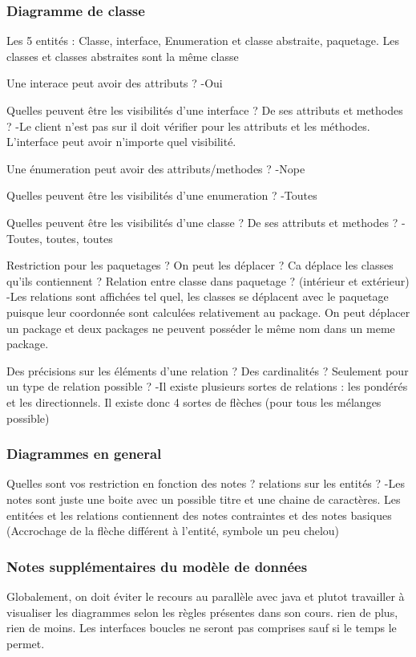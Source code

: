 \documentclass[a4paper,10pt]{article}
\begin{document}
\subsubsection*{Diagramme de classe}

Les 5 entités : Classe, interface, Enumeration et classe abstraite, paquetage.
Les classes et classes abstraites sont la même classe

Une interace peut avoir des attributs ? 
-Oui

Quelles peuvent être les visibilités d'une interface ? De ses attributs et methodes ?
-Le client n'est pas sur il doit vérifier pour les attributs et les méthodes. L'interface peut avoir n'importe quel visibilité. 

Une énumeration peut avoir des attributs/methodes ? 
-Nope

Quelles peuvent être les visibilités d'une enumeration ? 
-Toutes

Quelles peuvent être les visibilités d'une classe ? De ses attributs et methodes ?
-Toutes, toutes, toutes

Restriction pour les paquetages ? On peut les déplacer ? Ca déplace les classes qu'ils contiennent ? Relation entre classe dans paquetage ? (intérieur et extérieur)
-Les relations sont affichées tel quel, les classes se déplacent avec le paquetage puisque leur coordonnée sont calculées relativement au package.
On peut déplacer un package et deux packages ne peuvent posséder le même nom dans un meme package.

Des précisions sur les éléments d'une relation ? Des cardinalités ? Seulement pour un type de relation possible ?
-Il existe plusieurs sortes de relations : les pondérés et les directionnels. Il existe donc 4 sortes de flèches (pour tous les mélanges possible)


\subsubsection*{Diagrammes en general}
Quelles sont vos restriction en fonction des notes ? relations sur les entités ?
-Les notes sont juste une boite avec un possible titre et une chaine de caractères.
Les entitées et les relations contiennent des notes contraintes et des notes basiques (Accrochage de la flèche différent à l'entité, symbole un peu chelou)

\subsubsection*{Notes supplémentaires du modèle de données}
Globalement, on doit éviter le recours au parallèle avec java et plutot travailler à visualiser les diagrammes selon les règles présentes dans son cours. rien de plus, rien de moins.
Les interfaces boucles ne seront pas comprises sauf si le temps le permet.
\end{document}

